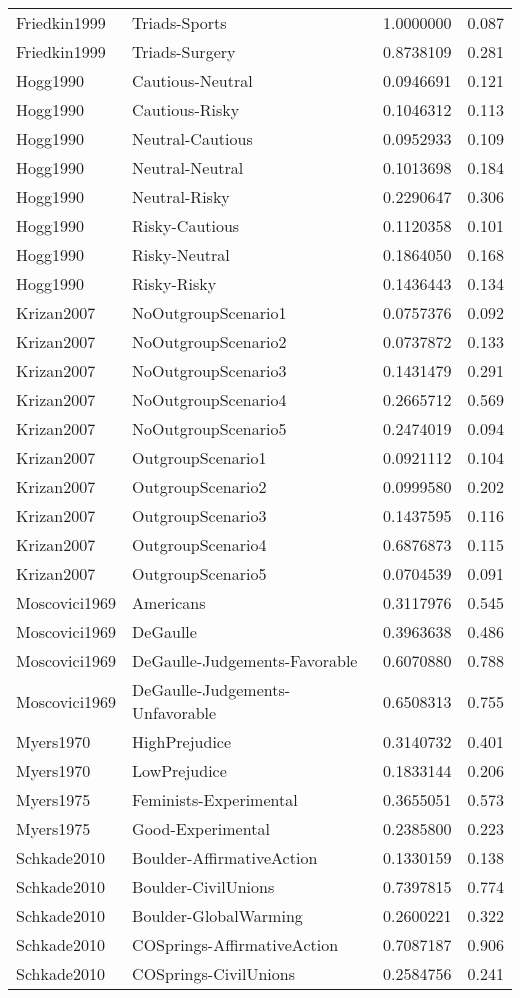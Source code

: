 \begin{longtable}{llrr}
Friedkin1999 & Triads-Sports & 1.0000000 & 0.087\\
Friedkin1999 & Triads-Surgery & 0.8738109 & 0.281\\
\addlinespace
Hogg1990 & Cautious-Neutral & 0.0946691 & 0.121\\
Hogg1990 & Cautious-Risky & 0.1046312 & 0.113\\
Hogg1990 & Neutral-Cautious & 0.0952933 & 0.109\\
Hogg1990 & Neutral-Neutral & 0.1013698 & 0.184\\
Hogg1990 & Neutral-Risky & 0.2290647 & 0.306\\
Hogg1990 & Risky-Cautious & 0.1120358 & 0.101\\
Hogg1990 & Risky-Neutral & 0.1864050 & 0.168\\
Hogg1990 & Risky-Risky & 0.1436443 & 0.134\\
\addlinespace
Krizan2007 & NoOutgroupScenario1 & 0.0757376 & 0.092\\
Krizan2007 & NoOutgroupScenario2 & 0.0737872 & 0.133\\
Krizan2007 & NoOutgroupScenario3 & 0.1431479 & 0.291\\
Krizan2007 & NoOutgroupScenario4 & 0.2665712 & 0.569\\
Krizan2007 & NoOutgroupScenario5 & 0.2474019 & 0.094\\
Krizan2007 & OutgroupScenario1 & 0.0921112 & 0.104\\
Krizan2007 & OutgroupScenario2 & 0.0999580 & 0.202\\
Krizan2007 & OutgroupScenario3 & 0.1437595 & 0.116\\
Krizan2007 & OutgroupScenario4 & 0.6876873 & 0.115\\
Krizan2007 & OutgroupScenario5 & 0.0704539 & 0.091\\
\addlinespace
Moscovici1969 & Americans & 0.3117976 & 0.545\\
Moscovici1969 & DeGaulle & 0.3963638 & 0.486\\
Moscovici1969 & DeGaulle-Judgements-Favorable & 0.6070880 & 0.788\\
\addlinespace
Moscovici1969 & DeGaulle-Judgements-Unfavorable & 0.6508313 & 0.755\\
Myers1970 & HighPrejudice & 0.3140732 & 0.401\\
Myers1970 & LowPrejudice & 0.1833144 & 0.206\\
Myers1975 & Feminists-Experimental & 0.3655051 & 0.573\\
Myers1975 & Good-Experimental & 0.2385800 & 0.223\\
\addlinespace
Schkade2010 & Boulder-AffirmativeAction & 0.1330159 & 0.138\\
Schkade2010 & Boulder-CivilUnions & 0.7397815 & 0.774\\
Schkade2010 & Boulder-GlobalWarming & 0.2600221 & 0.322\\
Schkade2010 & COSprings-AffirmativeAction & 0.7087187 & 0.906\\
Schkade2010 & COSprings-CivilUnions & 0.2584756 & 0.241\\
\bottomrule
\end{longtable}
